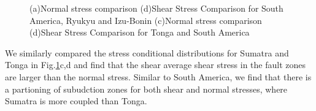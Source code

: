 \documentclass[12pt]{article}
\begin{document}
\begin{figure}[H]
\centering
\hspace{-0.2cm}
\hspace{-0.2cm}
\hspace{-0.2cm}
\hspace{-0.2cm}
\caption{(a)Normal stress comparison (d)Shear Stress Comparison for South America, Ryukyu and Izu-Bonin (c)Normal stress comparison (d)Shear Stress Comparison for Tonga and South America}
\label{fig:shear_smaller}
\end{figure}


We similarly compared the stress conditional distributions for Sumatra and Tonga in Fig.\ref{fig:shear_smaller}c,d and find that the shear average shear stress in the fault zones are larger than the normal stress. Similar to South America, we find that there is a partioning of subudction zones for both shear and normal stresses, where Sumatra is more coupled than Tonga.
\end{document}
